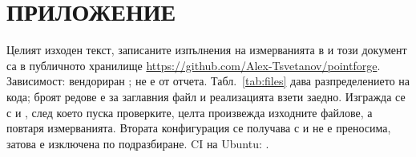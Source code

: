 \section*{ПРИЛОЖЕНИЕ}
\label{sec:appendix}

Целият изходен текст, записаните изпълнения на измерванията в  и този
документ са в публичното хранилище \url{https://github.com/Alex-Tsvetanov/pointforge}. Зависимост: вендориран ;  не е от отчета.
Табл.~\ref{tab:files} дава разпределението на кода; броят редове е за заглавния файл и
реализацията взети заедно. Изгражда се с 
и , след което  пуска проверките,
целта  произвежда изходните файлове, а 
повтаря измерванията. Втората конфигурация се получава с
 и не е преносима, затова е изключена по подразбиране.
CI на Ubuntu: .

